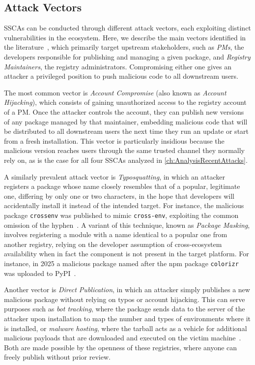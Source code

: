 \subsection{Attack Vectors}
\label{subsec:AttackVectors}

\acp{SSCA} can be conducted through different attack vectors, each exploiting distinct vulnerabilities in the ecosystem.
Here, we describe the main vectors identified in the literature~\cite{duan2020measuringsupplychainattacks},
which primarily target upstream stakeholders, such as \emph{\acp{PM}}, the developers responsible for publishing and managing a given package,
and \emph{Registry Maintainers}, the registry administrators.
Compromising either one gives an attacker a privileged position to push malicious code to all downstream users.

The most common vector is \emph{Account Compromise} (also known as \emph{Account Hijacking}), 
which consists of gaining unauthorized access to the registry account of a \ac{PM}.
Once the attacker controls the account, they can publish new versions of any package
managed by that maintainer, embedding malicious code that will be distributed
to all downstream users the next time they run an update or start from a fresh installation.
This vector is particularly insidious because the malicious version reaches users
through the same trusted channel they normally rely on, 
as is the case for all four \acp{SSCA} analyzed in \cref{ch:AnalysisRecentAttacks}.

A similarly prevalent attack vector is \emph{Typosquatting}, in which an attacker registers a package 
whose name closely resembles that of a popular, legitimate one, differing by only one or two characters, 
in the hope that developers will accidentally install it instead of the intended target.
For instance, the malicious package \texttt{crossenv} was published to mimic \texttt{cross-env}, 
exploiting the common omission of the hyphen~\cite{esempioTyposquatting}.
A variant of this technique, known as \emph{Package Masking}, involves 
registering a module with a name identical to a popular one from another registry,
relying on the developer assumption of cross-ecosystem availability when in fact the component is not present in the target platform.
For instance, in 2025 a malicious package named after the \ac{npm} package \texttt{colorizr} was uploaded to \ac{PyPI}~\cite{checkmarx2025colorama}.

Another vector is \emph{Direct Publication}, in which an attacker simply publishes a new 
malicious package without relying on typos or account hijacking. 
This can serve purposes such as \emph{bot tracking}, 
where the package sends data to the server of the attacker upon installation to map the number and types of environments where it is installed,
or \emph{malware hosting}, 
where the tarball acts as a vehicle for additional malicious payloads that are downloaded and executed on the victim machine~\cite{baldwin2019package}.
Both are made possible by the openness of these registries, where anyone can freely publish without prior review.

